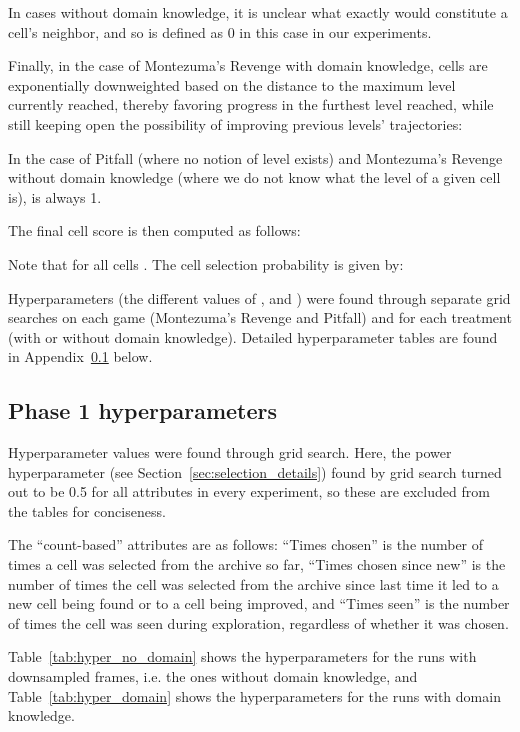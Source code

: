 \documentclass{article}
\begin{document}
In cases without domain knowledge, it is unclear what exactly would constitute a cell's neighbor, and so  is defined as 0 in this case in our experiments.

Finally, in the case of Montezuma's Revenge with domain knowledge, cells are exponentially downweighted based on the distance to the maximum level currently reached, thereby favoring progress in the furthest level reached, while still keeping open the possibility of improving previous levels' trajectories:


In the case of Pitfall (where no notion of level exists) and Montezuma's Revenge without domain knowledge (where we do not know what the level of a given cell is),  is always 1.

The final cell score is then computed as follows:


Note that  for all cells . The cell selection probability is given by:


Hyperparameters (the different values of ,  and ) were found through separate grid searches on each game (Montezuma's Revenge and Pitfall) and for each treatment (with or without domain knowledge). Detailed hyperparameter tables are found in Appendix~\ref{sec:hyperparameter_phase1} below.


\subsection{Phase 1 hyperparameters}
\label{sec:hyperparameter_phase1}

\FloatBarrier

Hyperparameter values were found through grid search. Here, the power hyperparameter  (see Section~\ref{sec:selection_details}) found by grid search turned out to be 0.5 for all attributes  in every experiment, so these are excluded from the tables for conciseness.

The ``count-based'' attributes are as follows: ``Times chosen'' is the number of times a cell was selected from the archive so far, ``Times chosen since new'' is the number of times the cell was selected from the archive since last time it led to a new cell being found or to a cell being improved, and ``Times seen'' is the number of times the cell was seen during exploration, regardless of whether it was chosen.

Table~\ref{tab:hyper_no_domain} shows the hyperparameters for the runs with downsampled frames, i.e. the ones without domain knowledge, and Table~\ref{tab:hyper_domain} shows the hyperparameters for the runs with domain knowledge.
\end{document}
